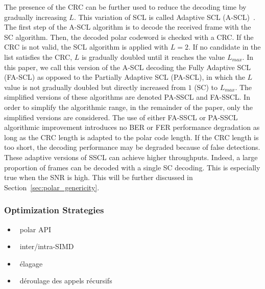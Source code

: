 The presence of the CRC can be further used to reduce the decoding time by
gradually increasing $L$. This variation of SCL is called Adaptive SCL
(A-SCL)~\cite{Li2012}. The first step of the A-SCL algorithm is to decode the
received frame with the SC algorithm. Then, the decoded polar codeword is
checked with a CRC. If the CRC is not valid, the SCL algorithm is applied with
$L=2$. If no candidate in the list satisfies the CRC, $L$ is gradually doubled
until it reaches the value $L_{max}$. In this paper, we call this version of the
A-SCL decoding the Fully Adaptive SCL (FA-SCL) as opposed to the Partially
Adaptive SCL (PA-SCL), in which the $L$ value is not gradually doubled but
directly increased from $1$ (SC) to $L_{max}$. The simplified versions of these
algorithms are denoted PA-SSCL and FA-SSCL. In order to simplify the algorithmic
range, in the remainder of the paper, only the simplified versions are
considered. The use of either FA-SSCL or PA-SSCL algorithmic improvement
introduces no BER or FER performance degradation as long as the CRC length is
adapted to the polar code length. If the CRC length is too short, the decoding
performance may be degraded because of false detections. These adaptive versions
of SSCL can achieve higher throughputs. Indeed, a large proportion of frames can
be decoded with a single SC decoding. This is especially true when the SNR is
high. This will be further discussed in Section~\ref{sec:polar_genericity}.

\subsubsection{Optimization Strategies}

\begin{itemize}
  \item \cmark~polar API
  \item \cmark~inter/intra-SIMD
  \item \cmark~élagage
  \item \cmark~déroulage des appels récursifs
\end{itemize}

